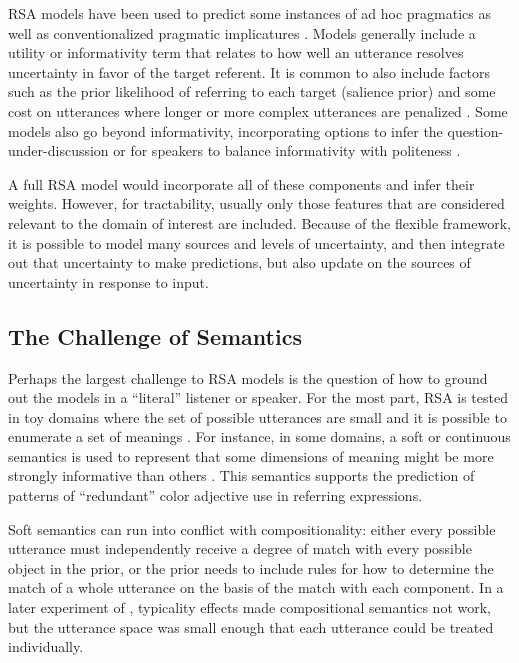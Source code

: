 \documentclass[]{article}
\begin{document}
RSA models have been used to predict some instances of ad hoc pragmatics as well as conventionalized pragmatic implicatures \citep{bergen, degen20200406, goodman2013}. Models generally include a utility or informativity term that relates to how well an utterance resolves uncertainty in favor of the target referent.  It is common to also include factors such as the prior likelihood of referring to each target (salience prior) and some cost on utterances where longer or more complex utterances are penalized \citep{goodman2016}. Some models also go beyond informativity, incorporating options to infer the question-under-discussion \citep{qing2016, kao2014} or for speakers to balance informativity with politeness \citep{yoon2018a}.

A full RSA model would incorporate all of these components and infer their weights. However, for tractability, usually only those features that are considered relevant to the domain of interest are included. Because of the flexible framework, it is possible to model many sources and levels of uncertainty, and then integrate out that uncertainty to make predictions, but also update on the sources of uncertainty in response to input. 

\subsection{The Challenge of Semantics}
Perhaps the largest challenge to RSA models is the question of how to ground out the models in a ``literal'' listener or speaker. For the most part, RSA is tested in toy domains where the set of possible utterances are small and it is possible to enumerate a set of meanings \citep{frank2012a,goodman2013, bergen}. For instance, in some domains, a soft or continuous semantics is used to represent that some dimensions of meaning might be more strongly informative than others \citep{degen20200406}. This semantics supports the prediction of patterns of  ``redundant'' color adjective use in referring expressions. 

Soft semantics can run into conflict with compositionality: either every possible utterance must independently receive a degree of match with every possible object in the prior, or the prior needs to include rules for how to determine the match of a whole utterance on the basis of the match with each component. In a later experiment of \citet{degen20200406}, typicality effects made compositional semantics not work, but the utterance space was small enough that each utterance could be treated individually. 
\end{document}
